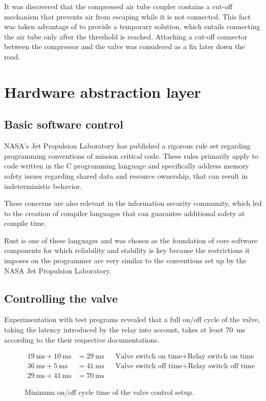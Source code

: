 It was discovered that the compressed air tube coupler contains a cut-off mechanism that prevents air from escaping while it is not connected. This fact was taken advantage of to provide a temporary solution, which entails connecting the air tube only after the threshold is reached. Attaching a cut-off connector between the compressor and the valve was considered as a fix later down the road.

\section{Hardware abstraction layer}
\author{Philip Trauner}

\subsection{Basic software control}
NASA's Jet Propulsion Laboratory \cite{jpl} has published a rigorous rule set \cite{jpl-rules} regarding programming conventions of mission critical code. These rules primarily apply to code written in the C programming language and specifically address memory safety issues regarding shared data and resource ownership, that can result in indeterministic behavior. 

These concerns are also relevant in the information security community, which led to the creation of compiler languages that can guarantee additional safety at compile time. 

Rust \cite{rust} is one of these languages and was chosen as the foundation of core software components for which reliability and stability is key because the restrictions it imposes on the programmer are very similar to the conventions set up by the NASA Jet Propulsion Laboratory. 

\subsection{Controlling the valve}
Experimentation with test programs revealed that a full on/off cycle of the valve, taking the latency introduced by the relay into account, takes at least \SI{70}{\milli\second} according to the their respective documentations. 
\begin{figure}[h]
\begin{align*}
    \SI{19}{\milli\second} + \SI{10}{\milli\second} &=\SI{29}{\milli\second} && \text{Valve switch on time} + \text{Relay switch on time} \\
    \SI{36}{\milli\second} + \SI{5}{\milli\second}  &=\SI{41}{\milli\second} && \text{Valve switch off time} + \text{Relay switch off time}\\
    \SI{29}{\milli\second} + \SI{41}{\milli\second} &=\SI{70}{\milli\second} 
\end{align*}
\caption{Minimum on/off cycle time of the valve control setup.}
\end{figure}

